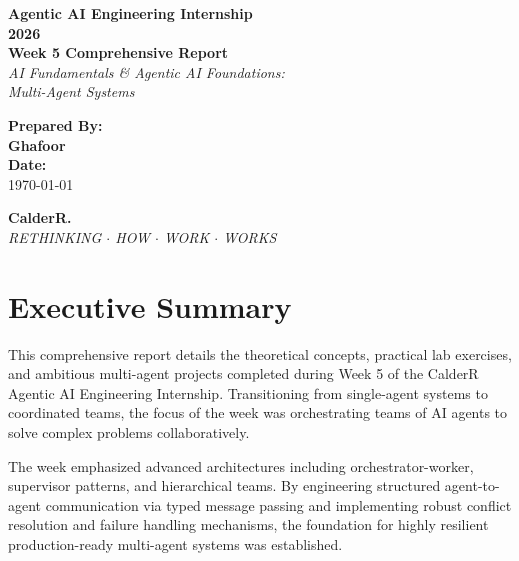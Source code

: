 \documentclass[12pt, a4paper]{article}
\begin{document}
\begin{titlepage}
    \centering
    \vspace*{2cm}
    
    {\Huge \textbf{\textcolor{primary}{Agentic AI Engineering Internship}}} \\[0.5cm]
    {\Huge \textbf{\textcolor{primary}{2026}}} \\[1.5cm]
    
    {\LARGE \textbf{Week 5 Comprehensive Report}} \\[0.5cm]
    {\Large \textit{AI Fundamentals \& Agentic AI Foundations: \\ Multi-Agent Systems}} \\[2cm]
    
    \begin{tcolorbox}[colback=accent, colframe=primary, rounded corners, boxrule=1.5pt, width=0.75\textwidth, arc=4mm]
        \centering
        \vspace{0.4cm}
        {\Large \textbf{Prepared By:}} \\[0.2cm]
        {\Large \textbf{Ghafoor}} \\[0.4cm]
        {\large \textbf{Date:}} \\
        {\large \today}
        \vspace{0.4cm}
    \end{tcolorbox}
    
    \vfill
    
    {\huge \textbf{\textcolor{secondary}{CalderR.}}} \\[0.2cm]
    {\large \textit{RETHINKING $\cdot$ HOW $\cdot$ WORK $\cdot$ WORKS}}
    \vspace*{1cm}
\end{titlepage}

\tableofcontents
\newpage

\section{Executive Summary}
This comprehensive report details the theoretical concepts, practical lab exercises, and ambitious multi-agent projects completed during Week 5 of the CalderR Agentic AI Engineering Internship. Transitioning from single-agent systems to coordinated teams, the focus of the week was orchestrating teams of AI agents to solve complex problems collaboratively. 

The week emphasized advanced architectures including orchestrator-worker, supervisor patterns, and hierarchical teams. By engineering structured agent-to-agent communication via typed message passing and implementing robust conflict resolution and failure handling mechanisms, the foundation for highly resilient production-ready multi-agent systems was established.
\end{document}
